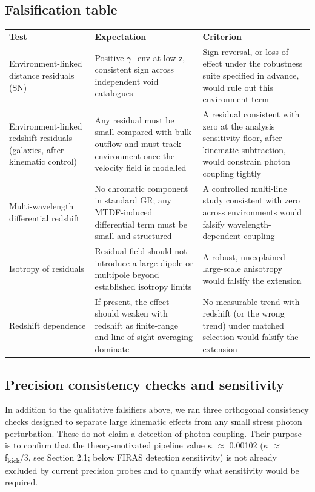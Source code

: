 \documentclass[11pt,a4paper]{article}
\begin{document}
\subsection{Falsification table}
\begin{table}[H]
\centering
\footnotesize
\begin{tabularx}{\linewidth}{l>{\RaggedRight\arraybackslash}X>{\RaggedRight\arraybackslash}X}
\toprule
\textbf{Test} & \textbf{Expectation} & \textbf{Criterion} \tabularnewline
Environment-linked distance residuals (SN) & Positive $\gamma$\_\allowbreak{}env at low z, consistent sign across independent void catalogues & Sign reversal, or loss of effect under the robustness suite specified in advance, would rule out this environment term \tabularnewline
Environment-linked redshift residuals (galaxies, after kinematic control) & Any residual must be small compared with bulk outflow and must track environment once the velocity field is modelled & A residual consistent with zero at the analysis sensitivity floor, after kinematic subtraction, would constrain photon coupling tightly \tabularnewline
Multi-wavelength differential redshift & No chromatic component in standard GR; any MTDF-induced differential term must be small and structured & A controlled multi-line study consistent with zero across environments would falsify wavelength-dependent coupling \tabularnewline
Isotropy of residuals & Residual field should not introduce a large dipole or multipole beyond established isotropy limits & A robust, unexplained large-scale anisotropy would falsify the extension \tabularnewline
Redshift dependence & If present, the effect should weaken with redshift as finite-range and line-of-sight averaging dominate & No measurable trend with redshift (or the wrong trend) under matched selection would falsify the extension \tabularnewline
\bottomrule
\end{tabularx}
\end{table}

\subsection{Precision consistency checks and sensitivity}
In addition to the qualitative falsifiers above, we ran three orthogonal consistency checks designed to separate large kinematic effects from any small stress photon perturbation. These do not claim a detection of photon coupling. Their purpose is to confirm that the theory-motivated pipeline value $\kappa$ $\approx$ 0.00102 ($\kappa$ $\approx$ f\textsubscript{kick}/3, see Section 2.1; below FIRAS detection sensitivity) is not already excluded by current precision probes and to quantify what sensitivity would be required.
\end{document}
